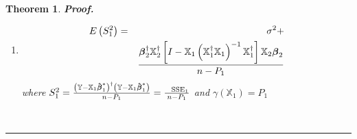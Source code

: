 \documentclass{article}
\newtheorem{theorem}{Theorem}
\newenvironment{proof}[1][Proof]{\noindent\textbf{#1.} }{\ \rule{0.5em}{0.5em}}
\begin{document}
\begin{theorem}
\begin{proof}
\begin{enumerate}
\begin{eqnarray*}
&\therefore &Var\left( \boldsymbol{\hat{\beta}}_{1}\right) -Var\left( 
\boldsymbol{\hat{\beta}}_{1}^{\ast }\right) =\sigma ^{2}\left[ \left( 
\mathbb{X}_{1}^{\dagger }\mathbb{X}\right) ^{-1}+\mathbb{A}B^{-1}\mathbb{A}%
^{\dagger }\right]  \\
&&-\sigma ^{2}\left( \mathbb{X}_{1}^{\dagger }\mathbb{X}\right) ^{-1} \\
&=&\sigma ^{2}\underset{\text{P.D. why?}}{\fbox{$\mathbb{AB}^{-1}\mathbb{A}%
^{\dagger }$}}
\end{eqnarray*}

\item 
\begin{eqnarray*}
E\left( S_{1}^{2}\right)  &=&\sigma ^{2}+ \\
&&\frac{\boldsymbol{\beta }_{2}^{\dagger }\mathbb{X}_{2}^{\dagger }\left[ I-%
\mathbb{X}_{1}\left( \mathbb{X}_{1}^{\dagger }\mathbb{X}_{1}\right) ^{-1}%
\mathbb{X}_{1}^{\dagger }\right] \mathbb{X}_{2}\boldsymbol{\beta }_{2}}{%
n-P_{1}}
\end{eqnarray*}%
where $S_{1}^{2}=\frac{\left( \mathbb{Y}-\mathbb{X}_{1}\boldsymbol{\hat{\beta%
}}_{1}^{\ast }\right) ^{\dagger }\left( \mathbb{Y}-\mathbb{X}_{1}\boldsymbol{%
\hat{\beta}}_{1}^{\ast }\right) }{n-P_{1}}=\frac{\text{SSE}_{1}}{n-P_{1}}$
and $\gamma \left( \mathbb{X}_{1}\right) =P_{1}$
\end{enumerate}
\end{proof}
\end{theorem}
\end{document}
